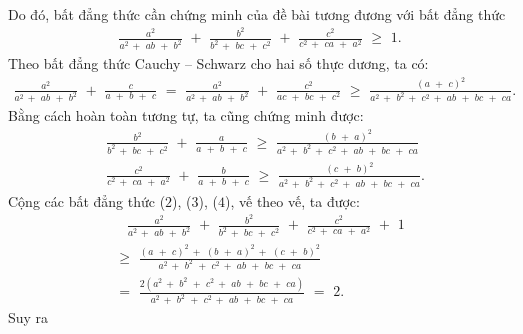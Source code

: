 \begin{multicols}{2}
\begin{align*}
	\end{align*}
	Do đó, bất đẳng thức cần chứng minh của đề bài tương đương với bất đẳng thức
	\begin{align*}
		\frac{{{a^2}}}{{{a^2}\, + \,\,ab\,\, + \,\,{b^2}}}\,\, + \,\,\frac{{{b^2}}}{{{b^2}\, + \,\,bc\,\, + \,\,{c^2}}}\,\, + \,\,\frac{{{c^2}}}{{{c^2}\, + \,\,ca\,\, + \,\,{a^2}}}\,\, \ge \,\,1. \tag{$1$}
	\end{align*}
	Theo bất đẳng thức Cauchy -- Schwarz cho hai số thực dương, ta có:
	\begin{align*}
		\frac{{{a^2}}}{{{a^2}\, + \,\,ab\,\, + \,\,{b^2}}}\,\, + \,\,\frac{c}{{a\,\, + \,\,b\,\, + \,\,c}}\,\, = \,\,\frac{{{a^2}}}{{{a^2}\, + \,\,ab\,\, + \,\,{b^2}}}\,\, + \,\,\frac{{{c^2}}}{{ac\,\, + \,\,bc\,\, + \,\,{c^2}}}\,\, \ge \,\,\frac{{{{\left( {a\,\, + \,\,c} \right)}^2}}}{{{a^2}\, + \,\,{b^2}\, + \,\,{c^2}\, + \,\,ab\,\, + \,\,bc\,\, + \,\,ca}}. \tag{$2$}
	\end{align*}
	Bằng cách hoàn toàn tương tự, ta cũng chứng minh được:
	\begin{align*}
		&\frac{{{b^2}}}{{{b^2}\, + \,\,bc\,\, + \,\,{c^2}}}\,\, + \,\,\frac{a}{{a\,\, + \,\,b\,\, + \,\,c}}\,\, \ge \,\,\frac{{{{\left( {b\,\, + \,\,a} \right)}^2}}}{{{a^2}\, + \,\,{b^2}\, + \,\,{c^2}\, + \,\,ab\,\, + \,\,bc\,\, + \,\,ca}} \tag{$3$}\\
		&\frac{{{c^2}}}{{{c^2}\, + \,\,ca\,\, + \,\,{a^2}}}\,\, + \,\,\frac{b}{{a\,\, + \,\,b\,\, + \,\,c}}\,\, \ge \,\,\frac{{{{\left( {c\,\, + \,\,b} \right)}^2}}}{{{a^2}\, + \,\,{b^2}\, + \,\,{c^2}\, + \,\,ab\,\, + \,\,bc\,\, + \,\,ca}}. \tag{$4$}
	\end{align*}
	Cộng các bất đẳng thức ($2$), ($3$), ($4$), vế theo vế, ta được:
	\begin{align*}
			\,\,\,\,\,\frac{{{a^2}}}{{{a^2}\, + \,\,ab\,\, + \,\,{b^2}}}\,\, + \,\,\frac{{{b^2}}}{{{b^2}\, + \,\,bc\,\, + \,\,{c^2}}}\,\, + \,\,\frac{{{c^2}}}{{{c^2}\, + \,\,ca\,\, + \,\,{a^2}}}\,\, + \,\,1\\
			\ge \,\,\frac{{{{\left( {a\,\, + \,\,c} \right)}^2}\, + \,\,{{\left( {b\,\, + \,\,a} \right)}^2}\, + \,\,{{\left( {c\,\, + \,\,b} \right)}^2}}}{{{a^2}\, + \,\,{b^2}\,\, + \,\,{c^2}\, + \,\,ab\,\, + \,\,bc\,\, + \,\,ca}}\\
			= \,\,\frac{{2\left( {{a^2}\, + \,\,{b^2}\,\, + \,\,{c^2}\, + \,\,ab\,\, + \,\,bc\,\, + \,\,ca} \right)}}{{{a^2}\, + \,\,{b^2}\,\, + \,\,{c^2}\, + \,\,ab\,\, + \,\,bc\,\, + \,\,ca}}\,\, = \,\,2.
	\end{align*}
	Suy ra
	\begin{align*}

\end{align*}
\end{multicols}
